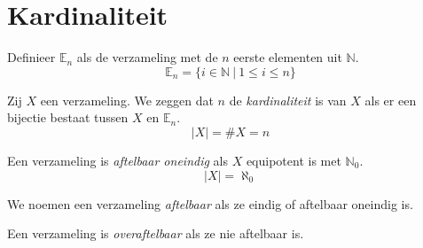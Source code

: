\chapter{Kardinaliteit}
\label{ch:kardinaliteit}

\begin{de}
  Definieer $\mathbb{E}_{n}$ als de verzameling met de $n$ eerste elementen uit $\mathbb{N}$.
  \[ \mathbb{E}_{n} = \{ i \in \mathbb{N}\ |\ 1 \le i \le n \}\] 
\end{de}

\begin{de}
  Zij $X$ een verzameling. We zeggen dat $n$ de \emph{kardinaliteit} is van $X$ als er een bijectie bestaat tussen $X$ en $\mathbb{E}_{n}$.
  \[ |X| = \#X = n \]
\end{de}

\begin{de}
  Een verzameling is \emph{aftelbaar oneindig} als $X$ equipotent is met $\mathbb{N}_{0}$.
  \[ |X| = \aleph_{0} \]
\end{de}

\begin{de}
  We noemen een verzameling \emph{aftelbaar} als ze eindig of aftelbaar oneindig is. 
\end{de}

\begin{de}
  Een verzameling is \emph{overaftelbaar} als ze nie aftelbaar is.
\end{de}

